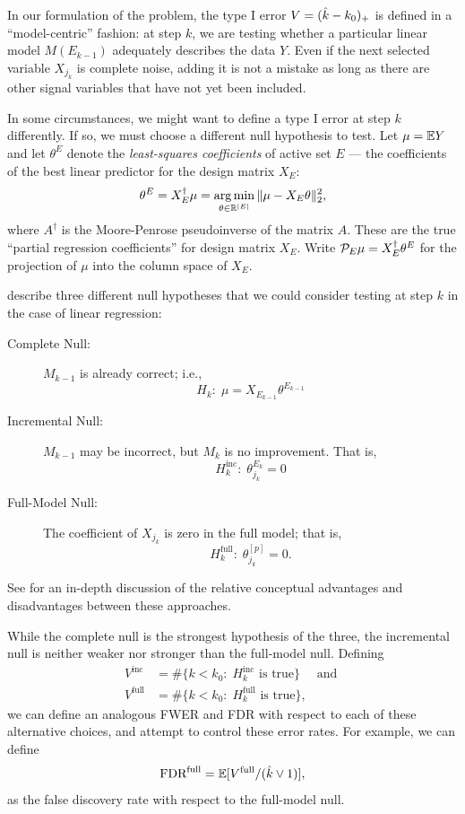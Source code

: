 \documentclass{article}
\begin{document}

In our formulation of the problem, the type I error $V=(\hat{k}-k_0)_+$ is defined in a ``model-centric'' fashion: at step $k$, we are testing  whether a particular linear model $M(E_{k-1})$ adequately describes the data $Y$. Even if the next selected variable $X_{j_k}$ is complete noise, adding it is not a mistake as long as there are other signal variables that have not yet been included. 

In some circumstances, we might want to define a type I error at step $k$ differently. If so, we must choose a different null hypothesis to test. Let $\mu = \mathbb{E} Y$ and let $\theta^E$ denote the {\em least-squares coefficients} of active set $E$ --- the coefficients of the best linear predictor for the design matrix $X_E$:
\[
\theta^E = X_E^\dagger \mu = \operatorname*{arg\,min}_{\theta\in \mathbb{R}^{|E|}} \|\mu - X_E\theta\|_2^2,
\]
where $A^\dagger$ is the Moore-Penrose pseudoinverse of the matrix $A$. 
These are the true ``partial regression coefficients''  for design matrix $X_E$.
 Write $\mathcal{P}_E\mu = X_E^\dagger \theta^E$ for the projection of $\mu$ into the column space of $X_E$.

\citet{gsell2013sequential} describe three different null hypotheses that we could consider testing at step $k$ in the case of linear regression:
\begin{description}
\item[Complete Null:] $M_{k-1}$ is already correct; i.e.,
\[
H_k:\;\mu = X_{E_{k-1}} \theta^{E_{k-1}}
\]

\item[Incremental Null:] $M_{k-1}$ may be incorrect, but $M_k$ is no improvement. That is, 
\[
H_k^{\text{inc}}:\; \theta_{j_k}^{E_k} = 0
\]
\item[Full-Model Null:] The coefficient of $X_{j_k}$ is zero in the     full model; that is, 
\[
H_k^{\text{full}}:\; \theta_{j_k}^{[p]} = 0.
\]
\end{description}
See \citet{gsell2013false} for an in-depth discussion of the relative conceptual advantages and disadvantages between these approaches.

While the complete null is the strongest hypothesis of the three, the incremental null is neither weaker nor stronger than the full-model null. Defining 
\begin{align}
V^{\text{inc}} &= \#\{k < k_0:\; H_k^{\text{inc}} \text{ is true}\} \quad \text{ and } \\
V^{\text{full}} &= \#\{k < k_0:\; H_k^{\text{full}} \text{ is true}\},
\end{align}
we can define an analogous FWER and FDR with respect to each of these alternative choices, and attempt to control these error rates. For example, we can define
\[
\text{FDR}^{\text{full}} = \mathbb{E}[V^{\text{full}} / (\hat{k} \vee 1)],
\]
as the false discovery rate with respect to the full-model null.
\end{document}
